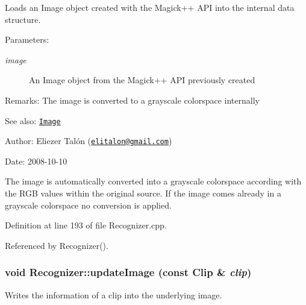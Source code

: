 Loads an Image object created with the Magick++ API into the internal data structure. 

\begin{Desc}
\item[Parameters:]
\begin{description}
\item[{\em image}]An Image object from the Magick++ API previously created\end{description}
\end{Desc}
\begin{Desc}
\item[Remarks:]The image is converted to a grayscale colorspace internally\end{Desc}
\begin{Desc}
\item[See also:]\href{http://www.imagemagick.org/Magick++/Image.html}{\tt Image}\end{Desc}
\begin{Desc}
\item[Author:]Eliezer Talón (\href{mailto:elitalon@gmail.com}{\tt elitalon@gmail.com}) \end{Desc}
\begin{Desc}
\item[Date:]2008-10-10\end{Desc}
The image is automatically converted into a grayscale colorspace according with the RGB values within the original source. If the image comes already in a grayscale colorspace no conversion is applied. 

Definition at line 193 of file Recognizer.cpp.

Referenced by Recognizer().\hypertarget{class_recognizer_0779d8bb035f7d51cb26fdc3d410e019}{
\subsubsection[updateImage]{\setlength{\rightskip}{0pt plus 5cm}void Recognizer::updateImage (const {\bf Clip} \& {\em clip})}}
\label{class_recognizer_0779d8bb035f7d51cb26fdc3d410e019}


Writes the information of a clip into the underlying image. 

